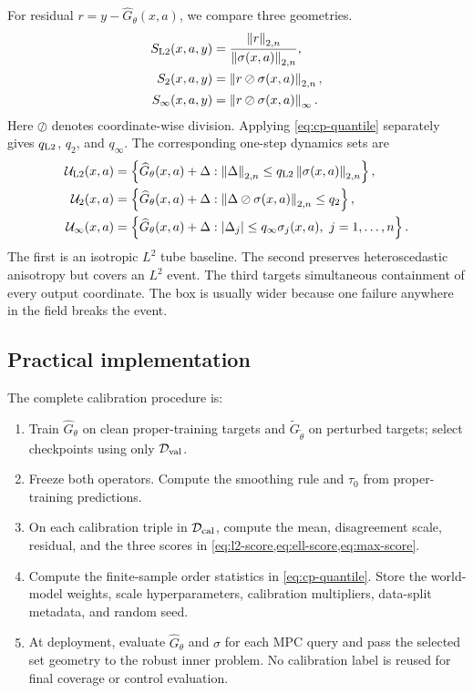 \documentclass[10pt]{article}
\newcommand{\U}{\mathcal U}
\newcommand{\D}{\mathcal D}
\newcommand{\normn}[1]{\left\lVert #1\right\rVert_{2,n}}
\newcommand{\norminf}[1]{\left\lVert #1\right\rVert_{\infty}}
\begin{document}
For residual $r=y-\widehat G_\theta(x,a)$, we compare three geometries.
\begin{align}
S_{\rm L2}(x,a,y)
&=\frac{\normn{r}}{\normn{\sigma(x,a)}},
\label{eq:l2-score}\\
S_{2}(x,a,y)
&=\normn{r\oslash\sigma(x,a)},
\label{eq:ell-score}\\
S_{\infty}(x,a,y)
&=\norminf{r\oslash\sigma(x,a)}.
\label{eq:max-score}
\end{align}
Here $\oslash$ denotes coordinate-wise division. Applying
\cref{eq:cp-quantile} separately gives $q_{\rm L2}$, $q_2$, and $q_\infty$.
The corresponding one-step dynamics sets are
\begin{align}
\U_{\rm L2}(x,a)
&=\left\{\widehat G_\theta(x,a)+\Delta:
\normn{\Delta}\le q_{\rm L2}\normn{\sigma(x,a)}\right\},
\label{eq:l2-set}\\
\U_2(x,a)
&=\left\{\widehat G_\theta(x,a)+\Delta:
\normn{\Delta\oslash\sigma(x,a)}\le q_2\right\},
\label{eq:ellipsoid-set}\\
\U_\infty(x,a)
&=\left\{\widehat G_\theta(x,a)+\Delta:
|\Delta_j|\le q_\infty\sigma_j(x,a),\ j=1,\ldots,n\right\}.
\label{eq:box-set}
\end{align}
The first is an isotropic $L^2$ tube baseline. The second preserves
heteroscedastic anisotropy but covers an $L^2$ event. The third targets
simultaneous containment of every output coordinate. The box is usually wider
because one failure anywhere in the field breaks the event.

\subsection{Practical implementation}

The complete calibration procedure is:
\begin{enumerate}[label=\textbf{Step \arabic*.}]
\item Train $\widehat G_\theta$ on clean proper-training targets and
$\widetilde G_{\widetilde\theta}$ on perturbed targets; select checkpoints
using only $\D_{\rm val}$.
\item Freeze both operators. Compute the smoothing rule and $\tau_0$ from
proper-training predictions.
\item On each calibration triple in $\D_{\rm cal}$, compute the mean,
disagreement scale, residual, and the three scores in
\cref{eq:l2-score,eq:ell-score,eq:max-score}.
\item Compute the finite-sample order statistics in
\cref{eq:cp-quantile}. Store the world-model weights, scale hyperparameters,
calibration multipliers, data-split metadata, and random seed.
\item At deployment, evaluate $\widehat G_\theta$ and $\sigma$ for each MPC
query and pass the selected set geometry to the robust inner problem. No
calibration label is reused for final coverage or control evaluation.
\end{enumerate}
\end{document}
